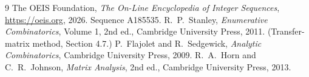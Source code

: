 \documentclass[11pt,a4paper]{article}
\theoremstyle{plain}
\theoremstyle{definition}
\begin{document}
\begin{thebibliography}{9}
 The OEIS Foundation, \emph{The On-Line Encyclopedia of Integer
Sequences}, \url{https://oeis.org}, 2026. Sequence A185535.
 R.~P.~Stanley, \emph{Enumerative Combinatorics}, Volume 1, 2nd ed.,
Cambridge University Press, 2011. (Transfer-matrix method, Section 4.7.)
 P.~Flajolet and R.~Sedgewick, \emph{Analytic Combinatorics}, Cambridge
University Press, 2009.
 R.~A.~Horn and C.~R.~Johnson, \emph{Matrix Analysis}, 2nd ed., Cambridge
University Press, 2013.
\end{thebibliography}
\end{document}
